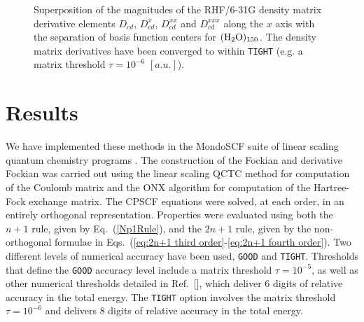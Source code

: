 \documentclass[prl,twocolumn,showpacs,twocolumngrid,superbib]{revtex4}
\begin{document}
{\begin{figure}[t]
  \caption{\protect
    Superposition of the magnitudes of the RHF/6-31G density matrix
    derivative elements $D_{cd}$, $D^{x}_{cd}$, $D^{xx}_{cd}$ and $D^{xxx}_{cd}$
    along the $x$ axis with the separation of basis function centers
    for $\rm (H_2O)_{150}$. The density matrix 
    derivatives have been converged to within {\tt TIGHT} (e.g. 
    a matrix threshold $\tau=10^{-6}$ $[a.u.]$).
  }\label{fig:Superposition_Decay}
\end{figure}

}

\section{Results} \label{RESULTS}

We have implemented these methods in the MondoSCF suite of linear scaling quantum chemistry 
programs \cite{MondoSCF}.  The construction of the Fockian and derivative Fockian was carried
out using the linear scaling QCTC method for computation of the Coulomb matrix \cite{MChallacombe97,CTymczak04a} and the
ONX algorithm \cite{ESchwegler97,CTymczak04b} for computation of the Hartree-Fock exchange matrix. 
The CPSCF equations were solved, at each order, in an entirely orthogonal representation.
Properties were evaluated using both the $n+1$ rule, given by Eq.~(\ref{Np1Rule}),  and the $2n+1$ rule, given by 
the non-orthogonal formulae in Eqs.~(\ref{eq:2n+1 third order}-\ref{eq:2n+1 fourth order}).
Two different levels of numerical 
accuracy have been used, {\tt GOOD} and {\tt TIGHT}.   Thresholds that define the {\tt GOOD} 
accuracy level include a matrix threshold $\tau=10^{-5}$, as well as other numerical thresholds 
detailed in Ref.~[], which deliver 6 digits of relative accuracy in the total 
energy.  The {\tt TIGHT} option involves the matrix threshold $\tau=10^{-6}$ and delivers 8 
digits of relative accuracy in the total energy.  
\end{document}
